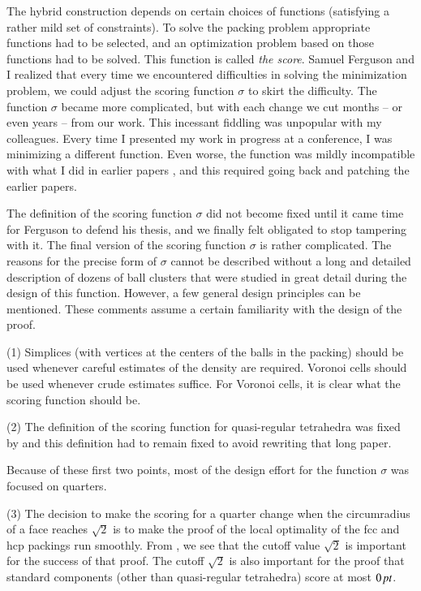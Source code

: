 The hybrid construction depends on certain choices of functions
(satisfying a rather mild set of constraints).  To solve the
packing problem appropriate functions had to be selected, and an
optimization problem based on those functions had to be solved.
This function is called {\it the score}.  Samuel Ferguson and I
realized that every time we encountered difficulties in solving
the minimization problem, we could adjust the scoring function
$\sigma$ to skirt the difficulty.  The function $\sigma$ became
more complicated, but with each change we cut months -- or even
years -- from our work.  This incessant fiddling was unpopular
with my colleagues.  Every time I presented my work in progress at
a conference, I was minimizing a different function.  Even worse,
the function was mildly incompatible with what I did in earlier
papers \cite{part1} \cite{part2}, and this required going back and
patching the earlier papers.

The definition of the scoring function $\sigma$ did not become
fixed until it came time for Ferguson to defend his thesis, and we
finally felt obligated to stop tampering with it.  The final
version of the scoring function $\sigma$ is rather complicated.
The reasons for the precise form of $\sigma$ cannot be described
without a long and detailed description of dozens of ball
clusters that were studied in great detail during the design of
this function. However, a few general design principles can be
mentioned.  These comments assume a certain familiarity with the
design of the proof.


(1) Simplices (with vertices at the centers of the balls in the
packing) should be used whenever careful estimates of the density
are required.  Voronoi cells should be used whenever crude
estimates suffice.  For Voronoi cells, it is clear what the
scoring function should be.



(2) The definition of the scoring function for quasi-regular
tetrahedra was fixed by \cite{part1} and this definition had to
remain fixed to avoid rewriting that long paper.

Because of these first two points, most of the design effort for
the function $\sigma$ was focused on quarters.

(3)  The decision to make the scoring for a quarter change when
the circumradius of a face reaches $\sqrt2$ is to make the proof
of the local optimality of the fcc and hcp packings run smoothly.
From \cite{part2}, we see that the cutoff value $\sqrt2$ is
important for the success of that proof.  The cutoff $\sqrt2$ is
also important for the proof that standard components (other than
quasi-regular tetrahedra) score at most $0\,\hbox{\it pt}$.

